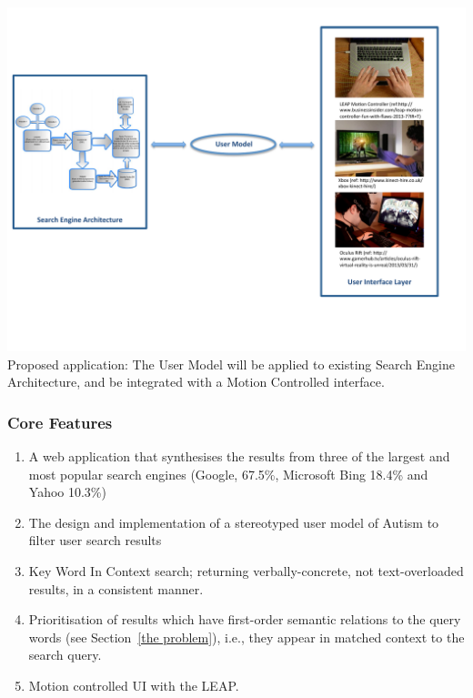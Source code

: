 \documentclass[10pt]{article}
\begin{document}
\begin{center}
\includegraphics[scale=0.7]{searchEngArchi}
Proposed application: The User Model will be applied to existing Search Engine Architecture\cite{seimage}, and be integrated with a Motion Controlled interface.
\end{center}


\subsubsection{Core Features}
\begin{enumerate}
\item  A web application that synthesises the results from three of the largest and most popular search engines (Google, 67.5\%, Microsoft Bing 18.4\% and Yahoo 10.3\%) \cite{adam}

\item The design and implementation of a stereotyped user model of Autism to filter user search results

\item Key Word In Context search; returning verbally-concrete, not text-overloaded results, in a consistent manner. 

\item Prioritisation of results which have first-order semantic relations to the query words (see Section~\ref{the problem}), i.e., they appear in matched context to the search query.

\item Motion controlled UI with the LEAP.
\end{enumerate}
\end{document}
